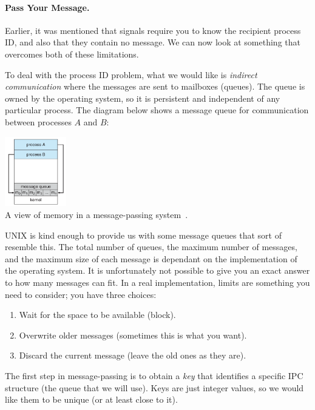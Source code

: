 \paragraph{Pass Your Message.} Earlier, it was mentioned that signals require you to know the recipient process ID, and also that they contain no message. We can now look at something that overcomes both of these limitations. 

To deal with the process ID problem, what we would like is \textit{indirect communication} where the messages are sent to mailboxes (queues). The queue is owned by the operating system, so it is persistent and independent of any particular process. The diagram below shows a message queue for communication between processes $A$ and $B$:
\begin{center}
	\includegraphics[width=0.2\textwidth]{images/message-passing.png}\\
	A view of memory in a message-passing system~\cite{osc}.
\end{center}

UNIX is kind enough to provide us with some message queues that sort of resemble this. The total number of queues, the maximum number of messages, and the maximum size of each message is dependant on the implementation of the operating system. It is unfortunately not possible to give you an exact answer to how many messages can fit. In a real implementation, limits are something you need to consider; you have three choices:

\begin{enumerate}
       \item Wait for the space to be available (block).
       \item Overwrite older messages (sometimes this is what you want).
       \item Discard the current message (leave the old ones as they are).
\end{enumerate}

The first step in message-passing is to obtain a \textit{key} that identifies a specific IPC structure (the queue that we will use). Keys are just integer values, so we would like them to be unique (or at least close to it).

